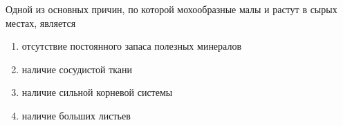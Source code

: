 
Одной
из основных причин, по которой мохообразные малы и растут в сырых местах,
является

\begin{enumerate}
    \item отсутствие постоянного запаса полезных минералов 
    \item наличие сосудистой ткани 
    \item наличие сильной корневой системы 
    \item наличие больших листьев
\end{enumerate}

